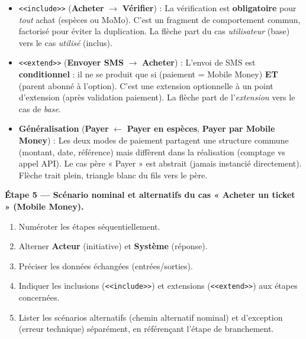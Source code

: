 \documentclass[11pt]{article}
\begin{document}
\begin{exoresolu}
\begin{propriete}
\begin{itemize}
  \item \texttt{<<include>>} (\textbf{Acheter} $\to$ \textbf{Vérifier}) : La vérification est \textbf{obligatoire} pour \emph{tout} achat (espèces ou MoMo). C'est un fragment de comportement commun, factorisé pour éviter la duplication. La flèche part du cas \emph{utilisateur} (base) vers le cas \emph{utilisé} (inclus).
  \item \texttt{<<extend>>} (\textbf{Envoyer SMS} $\to$ \textbf{Acheter}) : L'envoi de SMS est \textbf{conditionnel} : il ne se produit que si (paiement = Mobile Money) \textbf{ET} (parent abonné à l'option). C'est une extension optionnelle à un point d'extension (après validation paiement). La flèche part de l'\emph{extension} vers le cas de \emph{base}.
  \item \textbf{Généralisation} (\textbf{Payer} $\leftarrow$ \textbf{Payer en espèces}, \textbf{Payer par Mobile Money}) : Les deux modes de paiement partagent une structure commune (montant, date, référence) mais diffèrent dans la réalisation (comptage vs appel API). Le cas père « Payer » est abstrait (jamais instancié directement). Flèche trait plein, triangle blanc du fils vers le père.
\end{itemize}
\end{propriete}

\textbf{Étape 5 — Scénario nominal et alternatifs du cas « Acheter un ticket » (Mobile Money).}

\begin{methode}
\begin{enumerate}
  \item Numéroter les étapes séquentiellement.
  \item Alterner \textbf{Acteur} (initiative) et \textbf{Système} (réponse).
  \item Préciser les données échangées (entrées/sorties).
  \item Indiquer les inclusions (\texttt{<<include>>}) et extensions (\texttt{<<extend>>}) aux étapes concernées.
  \item Lister les scénarios alternatifs (chemin alternatif nominal) et d'exception (erreur technique) séparément, en référençant l'étape de branchement.
\end{enumerate}
\end{methode}


\end{exoresolu}
\end{document}
